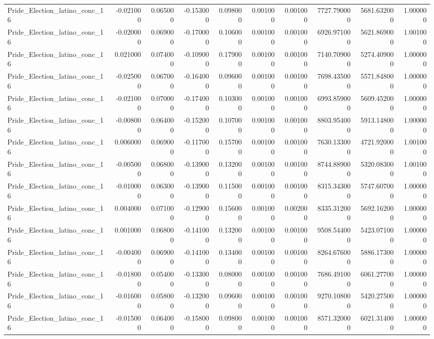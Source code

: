 \begin{table}
\begin{tabular}{lrrrrrrrrr}
Pride_Election_latino_conc_16 & -0.021000 & 0.065000 & -0.153000 & 0.098000 & 0.001000 & 0.001000 & 7727.790000 & 5681.632000 & 1.000000 \\
Pride_Election_latino_conc_16 & -0.020000 & 0.069000 & -0.170000 & 0.106000 & 0.001000 & 0.001000 & 6926.971000 & 5621.869000 & 1.001000 \\
Pride_Election_latino_conc_16 & 0.021000 & 0.074000 & -0.109000 & 0.179000 & 0.001000 & 0.001000 & 7140.709000 & 5274.409000 & 1.000000 \\
Pride_Election_latino_conc_16 & -0.025000 & 0.067000 & -0.164000 & 0.096000 & 0.001000 & 0.001000 & 7698.435000 & 5571.848000 & 1.000000 \\
Pride_Election_latino_conc_16 & -0.021000 & 0.070000 & -0.174000 & 0.103000 & 0.001000 & 0.001000 & 6993.859000 & 5609.452000 & 1.000000 \\
Pride_Election_latino_conc_16 & -0.008000 & 0.064000 & -0.152000 & 0.107000 & 0.001000 & 0.001000 & 8803.954000 & 5913.148000 & 1.000000 \\
Pride_Election_latino_conc_16 & 0.006000 & 0.069000 & -0.117000 & 0.157000 & 0.001000 & 0.001000 & 7630.133000 & 4721.920000 & 1.001000 \\
Pride_Election_latino_conc_16 & -0.005000 & 0.068000 & -0.139000 & 0.132000 & 0.001000 & 0.001000 & 8744.889000 & 5320.083000 & 1.001000 \\
Pride_Election_latino_conc_16 & -0.010000 & 0.063000 & -0.139000 & 0.115000 & 0.001000 & 0.001000 & 8315.343000 & 5747.607000 & 1.000000 \\
Pride_Election_latino_conc_16 & 0.004000 & 0.071000 & -0.129000 & 0.156000 & 0.001000 & 0.002000 & 8335.312000 & 5692.162000 & 1.000000 \\
Pride_Election_latino_conc_16 & 0.001000 & 0.068000 & -0.141000 & 0.132000 & 0.001000 & 0.001000 & 9508.544000 & 5423.071000 & 1.000000 \\
Pride_Election_latino_conc_16 & -0.004000 & 0.069000 & -0.141000 & 0.134000 & 0.001000 & 0.001000 & 8264.676000 & 5886.173000 & 1.000000 \\
Pride_Election_latino_conc_16 & -0.018000 & 0.054000 & -0.133000 & 0.080000 & 0.001000 & 0.001000 & 7686.491000 & 6061.277000 & 1.000000 \\
Pride_Election_latino_conc_16 & -0.016000 & 0.058000 & -0.132000 & 0.096000 & 0.001000 & 0.001000 & 9270.108000 & 5420.275000 & 1.000000 \\
Pride_Election_latino_conc_16 & -0.015000 & 0.064000 & -0.158000 & 0.098000 & 0.001000 & 0.001000 & 8571.320000 & 6021.314000 & 1.000000 \\

\end{tabular}
\end{table}

